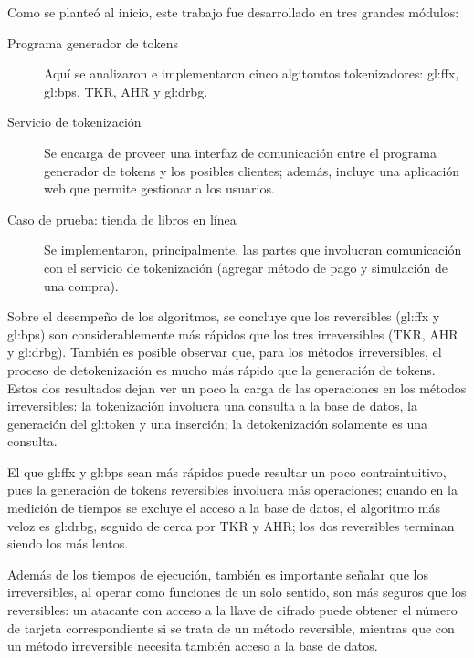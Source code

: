%
%

%
%
Como se planteó al inicio, este trabajo fue desarrollado en tres grandes
módulos:
\begin{description}
  \item [Programa generador de tokens] Aquí se analizaron e implementaron
    cinco algitomtos tokenizadores: \acrshort{gl:ffx}, \acrshort{gl:bps}, TKR,
    AHR y \acrshort{gl:drbg}.
  \item [Servicio de tokenización] Se encarga de proveer una interfaz de
    comunicación entre el programa generador de tokens y los posibles clientes;
    además, incluye una aplicación web que permite gestionar a los usuarios.
  \item [Caso de prueba: tienda de libros en línea] Se implementaron,
    principalmente, las partes que involucran comunicación con el servicio de
    tokenización (agregar método de pago y simulación de una compra).
\end{description}

Sobre el desempeño de los algoritmos, se concluye que los reversibles
(\acrshort{gl:ffx} y \acrshort{gl:bps}) son considerablemente más rápidos que
los tres irreversibles (TKR, AHR y \acrshort{gl:drbg}). También es posible
observar que, para los métodos irreversibles, el proceso de detokenización es
mucho más rápido que la generación de tokens.  Estos dos resultados dejan ver
un poco la carga de las operaciones en los métodos irreversibles: la
tokenización involucra una consulta a la base de datos, la generación del
\gls{gl:token} y una inserción; la detokenización solamente es una consulta.

El que \acrshort{gl:ffx} y \acrshort{gl:bps} sean más rápidos puede resultar
un poco contraintuitivo, pues la generación de tokens reversibles involucra
más operaciones; cuando en la medición de tiempos se excluye el acceso a  la
base de datos, el algoritmo más veloz es \acrshort{gl:drbg}, seguido de cerca
por TKR y AHR; los dos reversibles terminan siendo los más lentos.

Además de los tiempos de ejecución, también es importante señalar que los
irreversibles, al operar como funciones de un solo sentido, son más seguros
que los reversibles: un atacante con acceso a la llave de cifrado puede
obtener el número de tarjeta correspondiente si se trata de un método
reversible, mientras que con un método irreversible necesita también acceso a
la base de datos.

